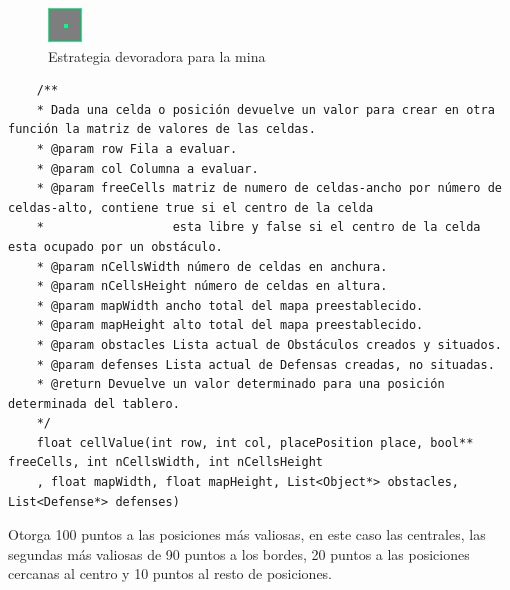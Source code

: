\begin{figure}
\centering
\includegraphics[width=0.7\linewidth]{./defenseValueCellsHead} %
\caption{Estrategia devoradora para la mina}
\label{fig:defenseValueCellsHead}
\end{figure}

\begin{lstlisting}
	/**
	* Dada una celda o posición devuelve un valor para crear en otra función la matriz de valores de las celdas.
	* @param row Fila a evaluar.
	* @param col Columna a evaluar.
	* @param freeCells matriz de numero de celdas-ancho por número de celdas-alto, contiene true si el centro de la celda
	*                  esta libre y false si el centro de la celda esta ocupado por un obstáculo.
	* @param nCellsWidth número de celdas en anchura.
	* @param nCellsHeight número de celdas en altura.
	* @param mapWidth ancho total del mapa preestablecido.
	* @param mapHeight alto total del mapa preestablecido.
	* @param obstacles Lista actual de Obstáculos creados y situados.
	* @param defenses Lista actual de Defensas creadas, no situadas.
	* @return Devuelve un valor determinado para una posición determinada del tablero.
	*/
	float cellValue(int row, int col, placePosition place, bool** freeCells, int nCellsWidth, int nCellsHeight
	, float mapWidth, float mapHeight, List<Object*> obstacles, List<Defense*> defenses)
\end{lstlisting}

Otorga 100 puntos a las posiciones más valiosas, en este caso las centrales, las segundas más valiosas de 90 puntos a los bordes, 20 puntos a las posiciones cercanas al centro y 10 puntos al resto de posiciones.